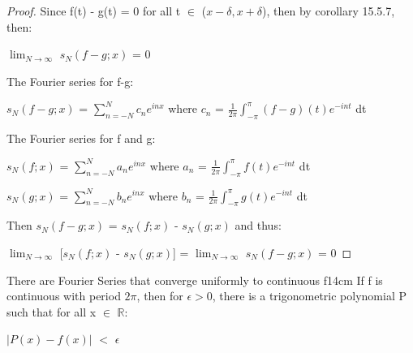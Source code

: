     \begin{proof}
        Since f(t) - g(t) = 0 for all t $\in$ ($x-\delta,x+\delta$),
        then by {\color{orange} corollary 15.5.7}, then:

        \hspace{0.5cm}
        $\lim_{N \rightarrow \infty}$ $s_N(f-g;x)$ = 0

        The Fourier series for f-g:

        \hspace{0.5cm}
        $s_N(f-g;x)$ = $\sum_{n=-N}^N c_ne^{inx}$
        \hspace{1cm}
        where $c_n$ = $\frac{1}{2\pi} \int_{-\pi}^{\pi} (f-g)(t)e^{-int}$ dt

        The Fourier series for f and g:

        \hspace{0.5cm}
        $s_N(f;x)$ = $\sum_{n=-N}^N a_ne^{inx}$
        \hspace{1cm}
        where $a_n$ = $\frac{1}{2\pi} \int_{-\pi}^{\pi} f(t)e^{-int}$ dt

        \hspace{0.5cm}
        $s_N(g;x)$ = $\sum_{n=-N}^N b_ne^{inx}$
        \hspace{1cm}
        where $b_n$ = $\frac{1}{2\pi} \int_{-\pi}^{\pi} g(t)e^{-int}$ dt

        Then $s_N(f-g;x)$ = $s_N(f;x)$ - $s_N(g;x)$ and thus:

        \hspace{0.5cm}
        $\lim_{N \rightarrow \infty}$ [$s_N(f;x)$ - $s_N(g;x)$]
        = $\lim_{N \rightarrow \infty}$ $s_N(f-g;x)$ = 0
    \end{proof}

    \vspace{0.5cm}



    \begin{wtheorem}{There are Fourier Series that converge uniformly
    to continuous f}{14cm}
        If f is continuous with period $2\pi$, then for $\epsilon > 0$,
        there is a trigonometric polynomial P such that
        for all x $\in$ $\mathbb{R}$:

        \hspace{0.5cm}
        $|P(x) - f(x)|$ $<$ $\epsilon$
    \end{wtheorem}

